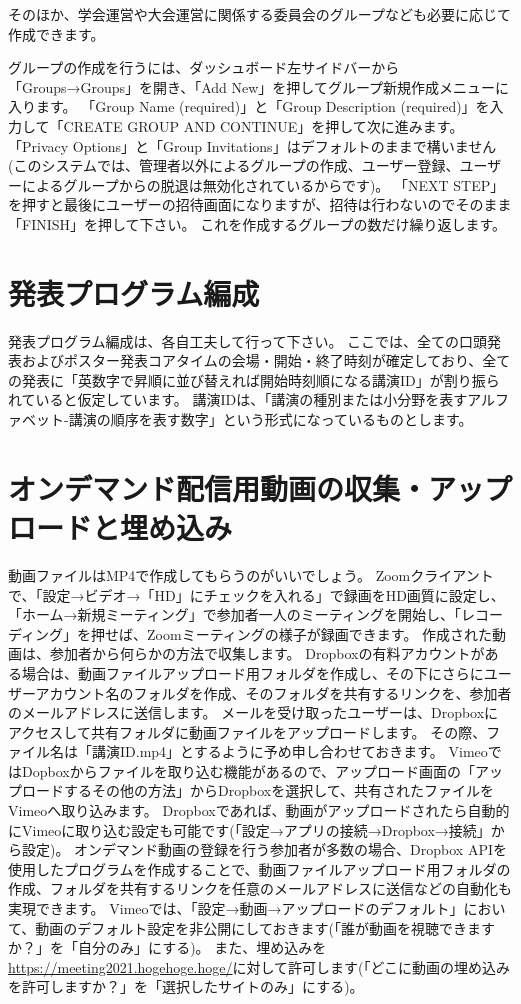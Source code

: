\documentclass[titlepage,10pt,a4paper,uplatex]{jsbook}
\begin{document}
そのほか、学会運営や大会運営に関係する委員会のグループなども必要に応じて作成できます。

グループの作成を行うには、ダッシュボード左サイドバーから「Groups→Groups」を開き、「Add New」を押してグループ新規作成メニューに入ります。
「Group Name (required)」と「Group Description (required)」を入力して「CREATE GROUP AND CONTINUE」を押して次に進みます。
「Privacy Options」と「Group Invitations」はデフォルトのままで構いません(このシステムでは、管理者以外によるグループの作成、ユーザー登録、ユーザーによるグループからの脱退は無効化されているからです)。
「NEXT STEP」を押すと最後にユーザーの招待画面になりますが、招待は行わないのでそのまま「FINISH」を押して下さい。
これを作成するグループの数だけ繰り返します。

\section{発表プログラム編成}

発表プログラム編成は、各自工夫して行って下さい。
ここでは、全ての口頭発表およびポスター発表コアタイムの会場・開始・終了時刻が確定しており、全ての発表に「英数字で昇順に並び替えれば開始時刻順になる講演ID」が割り振られていると仮定しています。
講演IDは、「講演の種別または小分野を表すアルファベット-講演の順序を表す数字」という形式になっているものとします。

\section{オンデマンド配信用動画の収集・アップロードと埋め込み}

動画ファイルはMP4で作成してもらうのがいいでしょう。
Zoomクライアントで、「設定→ビデオ→「HD」にチェックを入れる」で録画をHD画質に設定し、「ホーム→新規ミーティング」で参加者一人のミーティングを開始し、「レコーディング」を押せば、Zoomミーティングの様子が録画できます。
作成された動画は、参加者から何らかの方法で収集します。
Dropboxの有料アカウントがある場合は、動画ファイルアップロード用フォルダを作成し、その下にさらにユーザーアカウント名のフォルダを作成、そのフォルダを共有するリンクを、参加者のメールアドレスに送信します。
メールを受け取ったユーザーは、Dropboxにアクセスして共有フォルダに動画ファイルをアップロードします。
その際、ファイル名は「講演ID.mp4」とするように予め申し合わせておきます。
VimeoではDopboxからファイルを取り込む機能があるので、アップロード画面の「アップロードするその他の方法」からDropboxを選択して、共有されたファイルをVimeoへ取り込みます。
Dropboxであれば、動画がアップロードされたら自動的にVimeoに取り込む設定も可能です(「設定→アプリの接続→Dropbox→接続」から設定)。
オンデマンド動画の登録を行う参加者が多数の場合、Dropbox APIを使用したプログラムを作成することで、動画ファイルアップロード用フォルダの作成、フォルダを共有するリンクを任意のメールアドレスに送信などの自動化も実現できます。
Vimeoでは、「設定→動画→アップロードのデフォルト」において、動画のデフォルト設定を非公開にしておきます(「誰が動画を視聴できますか？」を「自分のみ」にする)。
また、埋め込みを\url{https://meeting2021.hogehoge.hoge/}に対して許可します(「どこに動画の埋め込みを許可しますか？」を「選択したサイトのみ」にする)。
\end{document}
